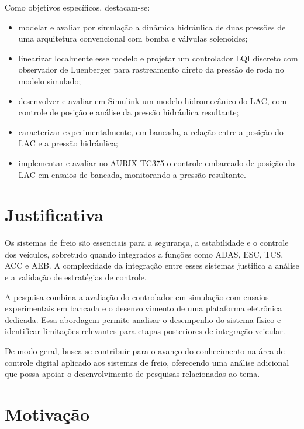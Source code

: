 Como objetivos específicos, destacam-se:
\begin{itemize}
    \item modelar e avaliar por simulação a dinâmica hidráulica de duas pressões de uma arquitetura convencional com bomba e válvulas solenoides;
    \item linearizar localmente esse modelo e projetar um controlador LQI discreto com observador de Luenberger para rastreamento direto da pressão de roda no modelo simulado;
    \item desenvolver e avaliar em Simulink um modelo hidromecânico do LAC, com controle de posição e análise da pressão hidráulica resultante;
    \item caracterizar experimentalmente, em bancada, a relação entre a posição do LAC e a pressão hidráulica;
    \item implementar e avaliar no AURIX TC375 o controle embarcado de posição do LAC em ensaios de bancada, monitorando a pressão resultante.
\end{itemize}



\section{ Justificativa }
\label{sec:introducao-3}

Os sistemas de freio são essenciais para a segurança, a estabilidade e o controle dos veículos, sobretudo quando integrados a funções como ADAS, \gls{ESC}, \gls{TCS}, \gls{ACC} e \gls{AEB}. A complexidade da integração entre esses sistemas justifica a análise e a validação de estratégias de controle.

A pesquisa combina a avaliação do controlador em simulação com ensaios experimentais em bancada e o desenvolvimento de uma plataforma eletrônica dedicada. Essa abordagem permite analisar o desempenho do sistema físico e identificar limitações relevantes para etapas posteriores de integração veicular.

De modo geral, busca-se contribuir para o avanço do conhecimento na área de controle digital aplicado aos sistemas de freio, oferecendo uma análise adicional que possa apoiar o desenvolvimento de pesquisas relacionadas ao tema.

\section{ Motivação }
\label{sec:introducao-4}

